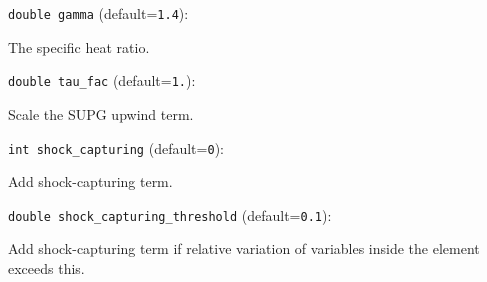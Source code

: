 \item\verb+double gamma+ {\rm(default=\verb|1.4|)}:

The specific heat ratio. 
\item\verb+double tau_fac+ {\rm(default=\verb|1.|)}:

Scale the SUPG upwind term. 
\item\verb+int shock_capturing+ {\rm(default=\verb|0|)}:

Add shock-capturing term.
\item\verb+double shock_capturing_threshold+ {\rm(default=\verb|0.1|)}:

Add shock-capturing term if relative variation of variables
inside the element exceeds this.
